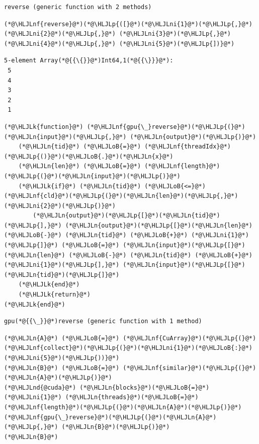 \documentclass[12pt,a4paper]{article}
\newcommand{\HLJLk}[1]{\textcolor[RGB]{148,91,176}{\textbf{#1}}}
\newcommand{\HLJLn}[1]{#1}
\newcommand{\HLJLnd}[1]{\textcolor[RGB]{214,102,97}{#1}}
\newcommand{\HLJLnf}[1]{\textcolor[RGB]{66,102,213}{#1}}
\newcommand{\HLJLni}[1]{\textcolor[RGB]{59,151,46}{#1}}
\newcommand{\HLJLoB}[1]{\textcolor[RGB]{102,102,102}{\textbf{#1}}}
\newcommand{\HLJLp}[1]{#1}
\begin{document}
\begin{lstlisting}
reverse (generic function with 2 methods)
\end{lstlisting}


\begin{lstlisting}
(*@\HLJLnf{reverse}@*)(*@\HLJLp{([}@*)(*@\HLJLni{1}@*)(*@\HLJLp{,}@*) (*@\HLJLni{2}@*)(*@\HLJLp{,}@*) (*@\HLJLni{3}@*)(*@\HLJLp{,}@*) (*@\HLJLni{4}@*)(*@\HLJLp{,}@*) (*@\HLJLni{5}@*)(*@\HLJLp{])}@*)
\end{lstlisting}

\begin{lstlisting}
5-element Array(*@{{\{}}@*)Int64,1(*@{{\}}}@*):
 5
 4
 3
 2
 1
\end{lstlisting}


\begin{lstlisting}
(*@\HLJLk{function}@*) (*@\HLJLnf{gpu{\_}reverse}@*)(*@\HLJLp{(}@*)(*@\HLJLn{input}@*)(*@\HLJLp{,}@*) (*@\HLJLn{output}@*)(*@\HLJLp{)}@*)
    (*@\HLJLn{tid}@*) (*@\HLJLoB{=}@*) (*@\HLJLnf{threadIdx}@*)(*@\HLJLp{()}@*)(*@\HLJLoB{.}@*)(*@\HLJLn{x}@*)
    (*@\HLJLn{len}@*) (*@\HLJLoB{=}@*) (*@\HLJLnf{length}@*)(*@\HLJLp{(}@*)(*@\HLJLn{input}@*)(*@\HLJLp{)}@*)
    (*@\HLJLk{if}@*) (*@\HLJLn{tid}@*) (*@\HLJLoB{<=}@*) (*@\HLJLnf{cld}@*)(*@\HLJLp{(}@*)(*@\HLJLn{len}@*)(*@\HLJLp{,}@*) (*@\HLJLni{2}@*)(*@\HLJLp{)}@*)
        (*@\HLJLn{output}@*)(*@\HLJLp{[}@*)(*@\HLJLn{tid}@*)(*@\HLJLp{],}@*) (*@\HLJLn{output}@*)(*@\HLJLp{[}@*)(*@\HLJLn{len}@*) (*@\HLJLoB{-}@*) (*@\HLJLn{tid}@*) (*@\HLJLoB{+}@*) (*@\HLJLni{1}@*)(*@\HLJLp{]}@*) (*@\HLJLoB{=}@*) (*@\HLJLn{input}@*)(*@\HLJLp{[}@*)(*@\HLJLn{len}@*) (*@\HLJLoB{-}@*) (*@\HLJLn{tid}@*) (*@\HLJLoB{+}@*) (*@\HLJLni{1}@*)(*@\HLJLp{],}@*) (*@\HLJLn{input}@*)(*@\HLJLp{[}@*)(*@\HLJLn{tid}@*)(*@\HLJLp{]}@*)
    (*@\HLJLk{end}@*)
    (*@\HLJLk{return}@*)
(*@\HLJLk{end}@*)
\end{lstlisting}

\begin{lstlisting}
gpu(*@{{\_}}@*)reverse (generic function with 1 method)
\end{lstlisting}


\begin{lstlisting}
(*@\HLJLn{A}@*) (*@\HLJLoB{=}@*) (*@\HLJLnf{CuArray}@*)(*@\HLJLp{(}@*)(*@\HLJLnf{collect}@*)(*@\HLJLp{(}@*)(*@\HLJLni{1}@*)(*@\HLJLoB{:}@*)(*@\HLJLni{5}@*)(*@\HLJLp{))}@*)
(*@\HLJLn{B}@*) (*@\HLJLoB{=}@*) (*@\HLJLnf{similar}@*)(*@\HLJLp{(}@*)(*@\HLJLn{A}@*)(*@\HLJLp{)}@*)
(*@\HLJLnd{@cuda}@*) (*@\HLJLn{blocks}@*)(*@\HLJLoB{=}@*)(*@\HLJLni{1}@*) (*@\HLJLn{threads}@*)(*@\HLJLoB{=}@*)(*@\HLJLnf{length}@*)(*@\HLJLp{(}@*)(*@\HLJLn{A}@*)(*@\HLJLp{)}@*) (*@\HLJLnf{gpu{\_}reverse}@*)(*@\HLJLp{(}@*)(*@\HLJLn{A}@*)(*@\HLJLp{,}@*) (*@\HLJLn{B}@*)(*@\HLJLp{)}@*)
(*@\HLJLn{B}@*)
\end{lstlisting}
\end{document}
